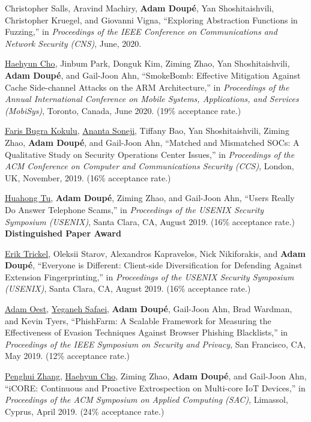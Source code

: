 \documentclass[11pt,letterpaper,sans]{moderncv}
\begin{document}
\begin{etaremune}
\item Christopher Salls, Aravind Machiry, \textbf{Adam Doup\'e}, Yan Shoshitaishvili, Christopher Kruegel, and Giovanni Vigna, ``Exploring Abstraction Functions in Fuzzing,'' in \emph{Proceedings of the IEEE Conference on Communications and Network Security (CNS)}, June, 2020.

\item \underline{Haehyun Cho}, Jinbum Park, Donguk Kim, Ziming Zhao, Yan Shoshitaishvili, \textbf{Adam Doup\'e}, and Gail-Joon Ahn, ``SmokeBomb: Effective Mitigation Against Cache Side-channel Attacks on the ARM Architecture,'' in \emph{Proceedings of the Annual International Conference on Mobile Systems, Applications, and Services (MobiSys)}, Toronto, Canada, June 2020. (19\% acceptance rate.)

\item \underline{Faris Bugra Kokulu}, \underline{Ananta Soneji}, Tiffany Bao, Yan Shoshitaishvili, Ziming Zhao, \textbf{Adam Doup\'e}, and Gail-Joon Ahn, ``Matched and Mismatched SOCs: A Qualitative Study on Security Operations Center Issues,'' in \emph{Proceedings of the ACM Conference on Computer and Communications Security (CCS)}, London, UK, November, 2019. (16\% acceptance rate.)

\item \underline{Huahong Tu}, \textbf{Adam Doup\'e}, Ziming Zhao, and Gail-Joon Ahn, ``Users Really Do Answer Telephone Scams,'' in \emph{Proceedings of the USENIX Security Symposium (USENIX)}, Santa Clara, CA, August 2019. (16\% acceptance rate.) \\
  \textbf{Distinguished Paper Award}

\item \underline{Erik Trickel}, Oleksii Starov, Alexandros Kapravelos, Nick Nikiforakis, and \textbf{Adam Doup\'e}, ``Everyone is Different: Client-side Diversification for Defending Against Extension Fingerprinting,'' in \emph{Proceedings of the USENIX Security Symposium (USENIX)}, Santa Clara, CA, August 2019. (16\% acceptance rate.)

\item \underline{Adam Oest}, \underline{Yeganeh Safaei}, \textbf{Adam Doup\'e}, Gail-Joon Ahn, Brad Wardman, and Kevin Tyers, ``PhishFarm: A Scalable Framework for Measuring the Effectiveness of Evasion Techniques Against Browser Phishing Blacklists,'' in \emph{Proceedings of the IEEE Symposium on Security and Privacy}, San Francisco, CA, May 2019. (12\% acceptance rate.)

 \item \underline{Penghui Zhang}, \underline{Haehyun Cho}, Ziming Zhao, \textbf{Adam Doup\'e}, and Gail-Joon Ahn, ``iCORE: Continuous and Proactive Extrospection on Multi-core IoT Devices,'' in \emph{Proceedings of the ACM Symposium on Applied Computing (SAC)}, Limassol, Cyprus, April 2019. (24\% acceptance rate.)


\end{etaremune}
\end{document}
